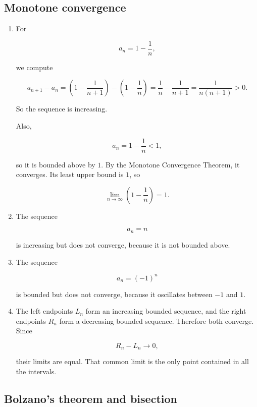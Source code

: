 \subsection*{Monotone convergence}

\begin{enumerate}
\item
For

\[
a_n=1-\frac1n,
\]

we compute

\[
a_{n+1}-a_n
=
\left(1-\frac1{n+1}\right)-\left(1-\frac1n\right)
=
\frac1n-\frac1{n+1}
=
\frac1{n(n+1)}>0.
\]

So the sequence is increasing.

Also,

\[
a_n=1-\frac1n<1,
\]

so it is bounded above by \(1\).  By the Monotone Convergence Theorem, it converges.
Its least upper bound is \(1\), so

\[
\boxed{
\lim_{n\to\infty}\left(1-\frac1n\right)=1.
}
\]

\item
The sequence

\[
a_n=n
\]

is increasing but does not converge, because it is not bounded above.

\item
The sequence

\[
a_n=(-1)^n
\]

is bounded but does not converge, because it oscillates between \(-1\) and \(1\).

\item
The left endpoints \(L_n\) form an increasing bounded sequence, and the right endpoints
\(R_n\) form a decreasing bounded sequence.  Therefore both converge.  Since

\[
R_n-L_n\to0,
\]

their limits are equal.  That common limit is the only point contained in all the
intervals.
\end{enumerate}

\subsection*{Bolzano's theorem and bisection}

